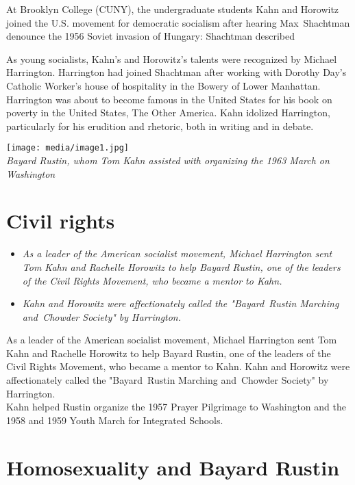 At Brooklyn College (CUNY), the undergraduate students Kahn and Horowitz
joined the U.S. movement for democratic socialism after hearing
Max~Shachtman denounce the 1956 Soviet invasion of Hungary: Shachtman
described

As young socialists, Kahn's and Horowitz's talents were recognized by
Michael Harrington. Harrington had joined Shachtman after working with
Dorothy Day's Catholic Worker's house of hospitality in the Bowery of
Lower Manhattan. Harrington was about to become famous in the United
States for his book on poverty in the United States, The Other America.
Kahn idolized Harrington, particularly for his erudition and rhetoric,
both in writing and in debate.

\texttt{[image: media/image1.jpg]}\\
\emph{Bayard Rustin, whom Tom Kahn assisted with organizing the 1963
March on Washington}

\section{Civil rights}\label{civil-rights}

\begin{itemize}
\item
  \emph{As a leader of the American socialist movement, Michael
  Harrington sent Tom Kahn and Rachelle Horowitz to help Bayard Rustin,
  one of the leaders of the Civil Rights Movement, who became a mentor
  to Kahn.}
\item
  \emph{Kahn and Horowitz were affectionately called the "Bayard~Rustin
  Marching and~Chowder Society" by Harrington.}
\end{itemize}

As a leader of the American socialist movement, Michael Harrington sent
Tom Kahn and Rachelle Horowitz to help Bayard Rustin, one of the leaders
of the Civil Rights Movement, who became a mentor to Kahn. Kahn and
Horowitz were affectionately called the "Bayard~Rustin Marching
and~Chowder Society" by Harrington.\\
Kahn helped Rustin organize the 1957 Prayer Pilgrimage to Washington and
the 1958 and 1959 Youth March for Integrated Schools.

\section{Homosexuality and Bayard
Rustin}\label{homosexuality-and-bayard-rustin}

